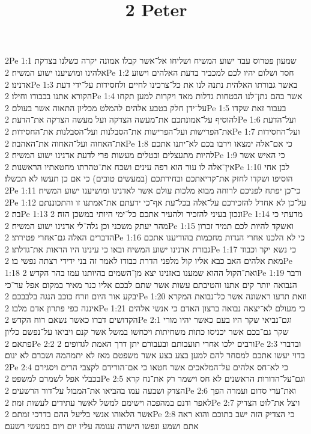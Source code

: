 

\title{2 Peter}

2Pe 1:1  שמעון פטרוס עבד ישוע המשיח ושליחו אל־אשר קבלו אמונה יקרה כשלנו בצדקת אלהינו ומושיענו ישוע המשיח׃
2Pe 1:2  חסד ושלום יהיו לכם למכביר בדעת האלהים וישוע אדנינו׃
2Pe 1:3  באשר גבורתו האלהית נתנה לנו את כל־צרכינו לחיים ולחסידות על־ידי דעת הקורא אתנו בכבודו וחילו׃
2Pe 1:4  אשר בהם נתן־לנו הבטחות גדלות מאד ויקרות למען תקחו על־ידן חלק בטבע אלהים להמלט מכליון התאוה אשר בעולם׃
2Pe 1:5  בעבור זאת שקדו להוסיף על־אמונתכם את־מעשה הצדקה ועל מעשה הצדקה את־הדעת׃
2Pe 1:6  ועל־הדעת את־הפרישות ועל־הפרישות את־הסבלנות ועל־הסבלנות את־החסידות׃
2Pe 1:7  ועל־החסידות את־האחוה ועל־האחוה את־האהבה׃
2Pe 1:8  כי אם־אלה ימצאו וירבו בכם לא־יתנו אתכם להיות מתעצלים ובטלים מעשות פרי לדעת אדנינו ישוע המשיח׃
2Pe 1:9  כי האיש אשר אין־אלה לו עור הוא רפה עינים ושכח את־טהרתו מחטאתיו הראשנות׃
2Pe 1:10  לכן אחי הוסיפו ושקדו לחזק את־קריאתכם ובחירתכם (במעשים טובים) כי אם כן תעשו לא תכשלו׃
2Pe 1:11  כי־כן יפתח לפניכם לרוחה מבוא מלכות עולם אשר לאדנינו ומושיענו ישוע המשיח׃
2Pe 1:12  על־כן לא אחדל להזכירכם על־אלה בכל־עת אף־כי ידעתם את־אמתנו זו והתכוננתם בה׃
2Pe 1:13  ונכון בעיני להזכיר ולהעיר אתכם כל־ימי היותי במשכן הזה׃
2Pe 1:14  מדעתי כי מהר יעתק משכני וכן גלה־לי אדנינו ישוע המשיח׃
2Pe 1:15  ואשקד להיות לכם תמיד זכרון הדברים האלה גם־אחרי פטירתי׃
2Pe 1:16  כי לא הלכנו אחרי הגדות מחכמות בהודיענו אתכם גבורת אדנינו ישוע המשיח ובאו כי עינינו היו הראות את־גדלתו׃
2Pe 1:17  כי נשא יקר וכבוד מאת אלהים האב כבא אליו קול מלפני הדרת כבודו לאמר זה בני ידידי רצתה נפשי בו׃
2Pe 1:18  ואת־הקול ההוא שמענו באזנינו יצא מן־השמים בהיותנו עמו בהר הקדש׃
2Pe 1:19  ודבר הנבואה יותר קים אתנו והטיבתם עשות אשר שתם לבכם אליו כנר מאיר במקום אפל עד־כי יבקע אור היום וזרח כוכב הנגה בלבבכם׃
2Pe 1:20  וזאת תדעו ראשונה אשר כל־נבואת המקרא איננה כפי פתרון אדם מלבו׃
2Pe 1:21  כי מעולם לא־יצאה נבואה ברצון האדם כי אנשי אלהים הקדושים דברו כאשר נשאם רוח הקדש׃
2Pe 2:1  וגם־נביאי שקר היו בעם כאשר יהיו מורי שקר גם־בכם אשר יכניסו כתות משחיתות ויכחשו במשל אשר קנם ויביאו על־נפשם כליון פתאם׃
2Pe 2:2  ורבים ילכו אחרי תועבותם ובעבורם יתן דרך האמת לגדופים׃
2Pe 2:3  ובדברי בדוי יעשו אתכם למסחר להם למען בצע בצע אשר משפטם מאז לא יתמהמה ושברם לא ינום׃
2Pe 2:4  כי לא־חס אלהים על־המלאכים אשר חטאו כי אם־הורידם לקצבי הרים ויסגירם בכבלי אפל לשמרם למשפט׃
2Pe 2:5  וגם־על־הדורות הראשנים לא חס וישמר רק את־נח קרא הצדק ושבעה עמו בהביאו את־המבול על־דור הרשעים׃
2Pe 2:6  ואת־ערי סדום ועמרה הפך לאפר ודנם במהפכה וישימם למשל לאשר עתידים לעשות זמה׃
2Pe 2:7  ויצל את־לוט הצדיק אשר הלאוהו אנשי בליעל ההם בדרכי זמתם׃
2Pe 2:8  כי הצדיק הזה ישב בתוכם והוא ראה אתם ושמע ונפשו הישרה עגומה עליו יום ויום במעשי רשעם׃

